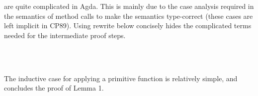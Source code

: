 \begin{AgdaAlign}
are quite complicated in Agda.
This is mainly due to the case analysis required in the semantics of method calls
to make the semantics type-correct
(these cases are left implicit in CP89).
Using rewrite below concisely hides the complicated terms needed for the intermediate proof steps.
%
\begin{code}%
%
\>[4]\AgdaSpace{}%
\AgdaSpace{}%
\AgdaSymbol{(}\AgdaSpace{}%
\AgdaSpace{}%
\AgdaSpace{}%
\AgdaSymbol{)}\AgdaSpace{}%
\AgdaSpace{}%
\AgdaSpace{}%
\<%
\\
\>[4][@{}l@{\AgdaIndent{0}}]%
\>[6]\AgdaSpace{}%
\AgdaSymbol{(}\AgdaSpace{}%
\AgdaSpace{}%
\AgdaSpace{}%
\AgdaSpace{}%
\AgdaSpace{}%
\AgdaSymbol{)}\<%
\\
%
\>[6]\AgdaSpace{}%
\AgdaSymbol{(}\AgdaSpace{}%
\AgdaSpace{}%
\AgdaSpace{}%
\AgdaSpace{}%
\AgdaSpace{}%
\AgdaSymbol{)}\AgdaSpace{}%
\AgdaSymbol{=}\AgdaSpace{}%
\<%
\end{code}
%
The inductive case for applying a primitive function is relatively simple,
and concludes the proof of Lemma 1.
%
\begin{code}%
%
\>[4]\AgdaSpace{}%
\AgdaSpace{}%
\AgdaSymbol{(}\AgdaSpace{}%
\AgdaSpace{}%
\AgdaSymbol{)}\AgdaSpace{}%
\AgdaSpace{}%
\AgdaSpace{}%
\AgdaSpace{}%
\AgdaSymbol{=}\<%
\\
\>[4][@{}l@{\AgdaIndent{0}}]%
\>[6]\<%
\\
\>[6][@{}l@{\AgdaIndent{0}}]%
\>[8]\AgdaSpace{}%
\AgdaSymbol{(}\AgdaSpace{}%
\AgdaSymbol{)}\AgdaSpace{}%
\AgdaSpace{}%
\AgdaSpace{}%
\AgdaSpace{}%
\AgdaSpace{}%
\AgdaSpace{}%
\AgdaSpace{}%
\AgdaSymbol{(}\AgdaSpace{}%
\AgdaSpace{}%
\AgdaSymbol{)}\<%
\\
%
\>[6]\<%
\\

\end{code}
\end{AgdaAlign}

